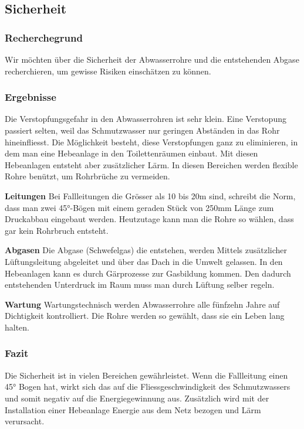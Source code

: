 \subsection{Sicherheit}


\subsubsection{Recherchegrund}
Wir möchten über die Sicherheit der Abwasserrohre und die entstehenden Abgase recherchieren, um gewisse Risiken einschätzen zu können. 

\subsubsection{Ergebnisse}

Die Verstopfungsgefahr in den Abwasserrohren ist sehr klein. %
Eine Verstopung passiert selten, weil das Schmutzwasser nur geringen Abständen in das Rohr hineinfliesst. Die Möglichkeit besteht, diese Verstopfungen ganz zu eliminieren, in dem man eine Hebeanlage in den Toilettenräumen einbaut. Mit diesen Hebeanlagen entsteht aber zusätzlicher Lärm. In diesen Bereichen werden flexible Rohre benützt, um Rohrbrüche zu vermeiden.

\textbf{Leitungen}
Bei Fallleitungen die Grösser als 10 bis 20\si{m} sind, schreibt die Norm, dass man zwei 45°-Bögen mit einem geraden Stück von 250\si{mm} Länge zum Druckabbau eingebaut werden. Heutzutage kann man die Rohre so wählen, dass gar kein Rohrbruch entsteht.

\textbf{Abgasen}
Die Abgase (Schwefelgas) die entstehen, werden Mittels zusätzlicher Lüftungsleitung abgeleitet und über das Dach in die Umwelt gelassen. In den Hebeanlagen kann es durch Gärprozesse zur Gasbildung kommen. Den dadurch entstehenden Unterdruck im Raum muss man durch Lüftung selber regeln. 

\textbf{Wartung}
Wartungstechnisch werden Abwasserrohre alle fünfzehn Jahre auf Dichtigkeit kontrolliert. Die Rohre werden so gewählt, dass sie ein Leben lang halten.

\subsubsection{Fazit}

Die Sicherheit ist in vielen Bereichen gewährleistet. Wenn die Fallleitung einen 45° Bogen hat, wirkt sich das auf die Fliessgeschwindigkeit des Schmutzwassers und somit negativ auf die Energiegewinnung aus. Zusätzlich wird mit der Installation einer Hebeanlage Energie aus dem Netz bezogen und Lärm verursacht.%

\clearpage 





